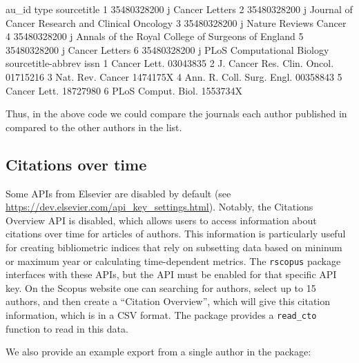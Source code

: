 \begin{Schunk}
\begin{Soutput}
        au_id type                                        sourcetitle
1 35480328200    j                                     Cancer Letters
2 35480328200    j   Journal of Cancer Research and Clinical Oncology
3 35480328200    j                              Nature Reviews Cancer
4 35480328200    j Annals of the Royal College of Surgeons of England
5 35480328200    j                                     Cancer Letters
6 35480328200    j                         PLoS Computational Biology
           sourcetitle-abbrev     issn
1                Cancer Lett. 03043835
2 J. Cancer Res. Clin. Oncol. 01715216
3            Nat. Rev. Cancer 1474175X
4   Ann. R. Coll. Surg. Engl. 00358843
5                Cancer Lett. 18727980
6          PLoS Comput. Biol. 1553734X
\end{Soutput}
\end{Schunk}

Thus, in the above code we could compare the journals each author
published in compared to the other authors in the list.

\hypertarget{citations-over-time}{%
\subsection{Citations over time}\label{citations-over-time}}

\label{sec:citetime}

Some APIs from Elsevier are disabled by default (see
\url{https://dev.elsevier.com/api_key_settings.html}). Notably, the
Citations Overview API is disabled, which allows users to access
information about citations over time for articles of authors. This
information is particularly useful for creating bibliometric indices
that rely on subsetting data based on mininum or maximum year or
calculating time-dependent metrics. The \texttt{rscopus} package
interfaces with these APIs, but the API must be enabled for that
specific API key. On the Scopus website one can searching for authors,
select up to 15 authors, and then create a ``Citation Overview'', which
will give this citation information, which is in a CSV format. The
 package provides a \texttt{read\_cto} function to read in
this data.

We also provide an example export from a single author in the package:

